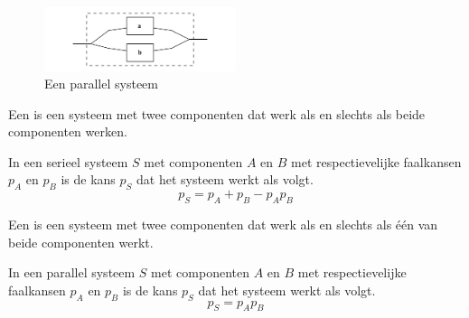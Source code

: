 \documentclass[main.tex]{subfiles}
\begin{document}
\begin{figure}[H]
  \caption{Een parallel systeem}
  \centering
    \includegraphics[width=0.5\textwidth]{assets/systeem-parallel.png}
\end{figure}

\begin{de}
  Een  is een systeem met twee componenten dat werk als en slechts als beide componenten werken.
\end{de}

\begin{st}
  In een serieel systeem $S$ met componenten $A$ en $B$ met respectievelijke faalkansen $p_{A}$ en $p_{B}$ is de kans $p_{S}$ dat het systeem werkt als volgt.
  \[ p_{S} = p_{A} + p_{B} -p_{A}p_{B} \]
\end{st}

\begin{de}
  Een  is een systeem met twee componenten dat werk als en slechts als \'e\'en van beide componenten werkt.
\end{de}

\begin{st}
  In een parallel systeem $S$ met componenten $A$ en $B$ met respectievelijke faalkansen $p_{A}$ en $p_{B}$ is de kans $p_{S}$ dat het systeem werkt als volgt.
  \[ p_{S} = p_{A}p_{B} \]
\end{st}
\end{document}
